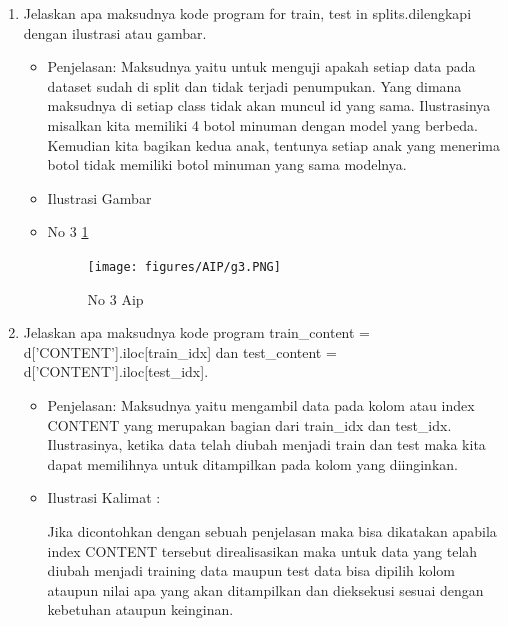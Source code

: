 \begin{enumerate}
\item Jelaskan apa maksudnya kode program for train, test in splits.dilengkapi dengan ilustrasi atau gambar.
\begin{itemize}
\item Penjelasan: Maksudnya yaitu untuk menguji apakah setiap data pada dataset sudah di split dan tidak terjadi penumpukan. Yang dimana maksudnya di setiap class tidak akan muncul id yang sama. Ilustrasinya misalkan kita memiliki 4 botol minuman dengan model yang berbeda. Kemudian kita bagikan kedua anak, tentunya setiap anak yang menerima botol tidak memiliki botol minuman  yang sama modelnya.
\par 
\par
\item Ilustrasi Gambar
\item No 3  \ref{teori3}
\begin{figure}[!hbtp]
\centering
\texttt{[image: figures/AIP/g3.PNG]}
\caption{No 3 Aip}
\label{teori3}
\end{figure}
\par
\end{itemize}
\par
\par

\item Jelaskan apa maksudnya kode program {train\_content = d['CONTENT'].iloc[train\_idx]} dan {test\_content = d['CONTENT'].iloc[test\_idx]}.
\begin{itemize}
\item Penjelasan: Maksudnya yaitu mengambil data pada kolom atau index CONTENT yang merupakan bagian dari train\_idx dan test\_idx. Ilustrasinya, ketika data telah diubah menjadi train dan test maka kita dapat memilihnya untuk ditampilkan pada kolom yang diinginkan.
\par 
\par
\item Ilustrasi Kalimat :
\par Jika dicontohkan dengan sebuah penjelasan maka bisa dikatakan apabila index CONTENT tersebut direalisasikan maka untuk data yang telah diubah menjadi training data maupun test data bisa dipilih kolom ataupun nilai apa yang akan ditampilkan dan dieksekusi sesuai dengan kebetuhan ataupun keinginan.
\end{itemize}
\par
\par


\end{enumerate}
